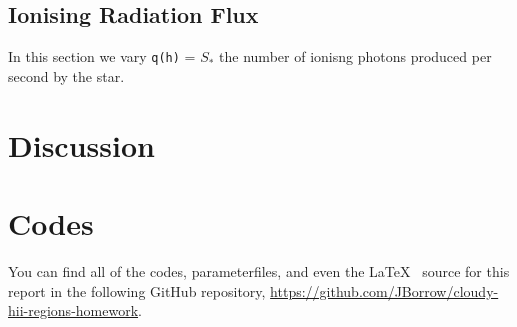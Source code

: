 \documentclass[a4paper]{article}
\begin{document}
\subsection{Ionising Radiation Flux}\label{sec:ionising}

In this section we vary {\tt q(h)} = $S_*$ the number of ionisng photons
produced per second by the star.

\section{Discussion}

\section{Codes}

You can find all of the codes, parameterfiles, and even the \LaTeX~ source
for this report in the following GitHub repository,
\url{https://github.com/JBorrow/cloudy-hii-regions-homework}.


\end{document}
